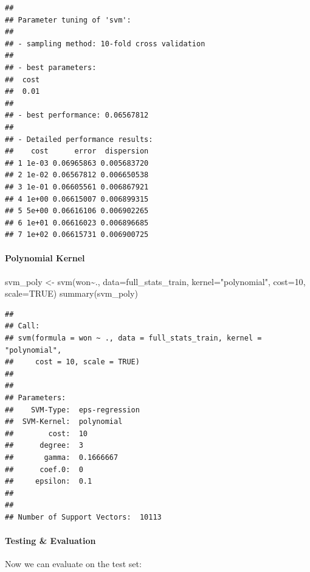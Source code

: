\documentclass[
]{article}
\newenvironment{Shaded}{\begin{snugshade}}{\end{snugshade}}
\newcommand{\AttributeTok}[1]{\textcolor[rgb]{0.77,0.63,0.00}{#1}}
\newcommand{\ConstantTok}[1]{\textcolor[rgb]{0.00,0.00,0.00}{#1}}
\newcommand{\DecValTok}[1]{\textcolor[rgb]{0.00,0.00,0.81}{#1}}
\newcommand{\FunctionTok}[1]{\textcolor[rgb]{0.00,0.00,0.00}{#1}}
\newcommand{\NormalTok}[1]{#1}
\newcommand{\OtherTok}[1]{\textcolor[rgb]{0.56,0.35,0.01}{#1}}
\newcommand{\SpecialCharTok}[1]{\textcolor[rgb]{0.00,0.00,0.00}{#1}}
\newcommand{\StringTok}[1]{\textcolor[rgb]{0.31,0.60,0.02}{#1}}
\begin{document}
\begin{verbatim}
## 
## Parameter tuning of 'svm':
## 
## - sampling method: 10-fold cross validation 
## 
## - best parameters:
##  cost
##  0.01
## 
## - best performance: 0.06567812 
## 
## - Detailed performance results:
##    cost      error  dispersion
## 1 1e-03 0.06965863 0.005683720
## 2 1e-02 0.06567812 0.006650538
## 3 1e-01 0.06605561 0.006867921
## 4 1e+00 0.06615007 0.006899315
## 5 5e+00 0.06616106 0.006902265
## 6 1e+01 0.06616023 0.006896685
## 7 1e+02 0.06615731 0.006900725
\end{verbatim}

\hypertarget{polynomial-kernel}{%
\paragraph{Polynomial Kernel}\label{polynomial-kernel}}

\begin{Shaded}
\begin{Highlighting}[]
\NormalTok{svm\_poly }\OtherTok{\textless{}{-}} \FunctionTok{svm}\NormalTok{(won}\SpecialCharTok{\textasciitilde{}}\NormalTok{., }\AttributeTok{data=}\NormalTok{full\_stats\_train, }\AttributeTok{kernel=}\StringTok{"polynomial"}\NormalTok{, }\AttributeTok{cost=}\DecValTok{10}\NormalTok{, }\AttributeTok{scale=}\ConstantTok{TRUE}\NormalTok{)}
\FunctionTok{summary}\NormalTok{(svm\_poly)}
\end{Highlighting}
\end{Shaded}

\begin{verbatim}
## 
## Call:
## svm(formula = won ~ ., data = full_stats_train, kernel = "polynomial", 
##     cost = 10, scale = TRUE)
## 
## 
## Parameters:
##    SVM-Type:  eps-regression 
##  SVM-Kernel:  polynomial 
##        cost:  10 
##      degree:  3 
##       gamma:  0.1666667 
##      coef.0:  0 
##     epsilon:  0.1 
## 
## 
## Number of Support Vectors:  10113
\end{verbatim}

\hypertarget{testing-evaluation-1}{%
\paragraph{Testing \& Evaluation}\label{testing-evaluation-1}}

Now we can evaluate on the test set:
\end{document}
